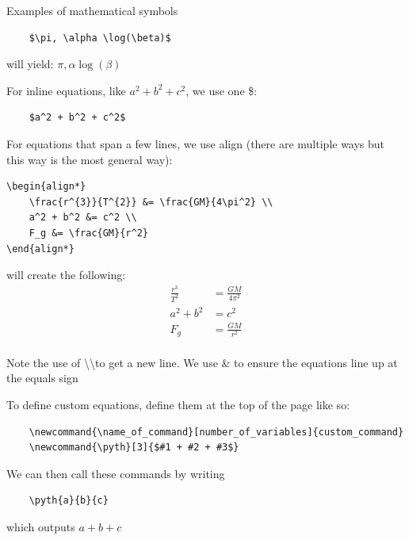 \begin{frame}[fragile]

Examples of mathematical symbols
\begin{verbatim}
    $\pi, \alpha \log(\beta)$ 
\end{verbatim}

will yield: $\pi, \alpha \log(\beta)$ 

\end{frame}

\begin{frame}[fragile]
For inline equations, like $a^2 + b^2 + c^2$, we use one \$:
\begin{verbatim}
    $a^2 + b^2 + c^2$
\end{verbatim}

For equations that span a few lines, we use align (there are multiple ways but this way is the most general way): 
\begin{verbatim}
\begin{align*}
    \frac{r^{3}}{T^{2}} &= \frac{GM}{4\pi^2} \\
    a^2 + b^2 &= c^2 \\
    F_g &= \frac{GM}{r^2}
\end{align*}  
\end{verbatim}
will create the following:
\begin{align*}
    \frac{r^{3}}{T^{2}} &= \frac{GM}{4\pi^2} \\
    a^2 + b^2 &= c^2 \\
    F_g &= \frac{GM}{r^2}
\end{align*}  
\\
Note the use of \textbackslash\textbackslash  to get a new line.
We use \& to ensure the equations line up at the equals sign

\end{frame}

\newcommand{\pyth}[3]{$#1 + #2 + #3$}

\begin{frame}[fragile]
To define custom equations, define them at the top of the page like so:

\begin{verbatim}
    \newcommand{\name_of_command}[number_of_variables]{custom_command}
    \newcommand{\pyth}[3]{$#1 + #2 + #3$}
\end{verbatim}

We can then call these commands by writing
\begin{verbatim}
    \pyth{a}{b}{c}
\end{verbatim}
which outputs \pyth{a}{b}{c}

\end{frame}

